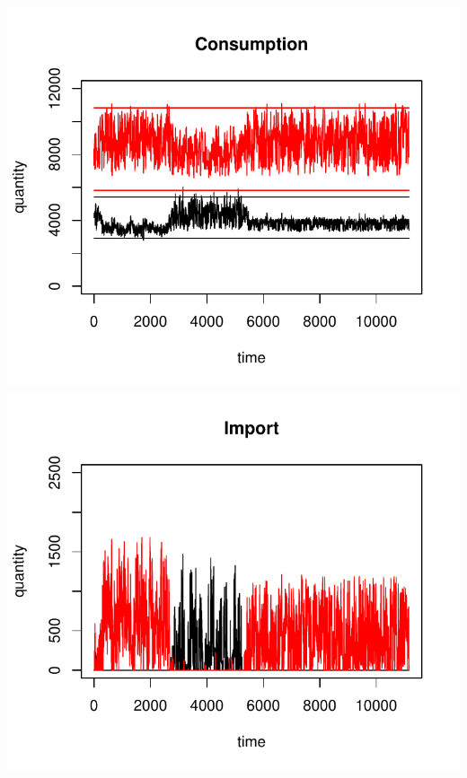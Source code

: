 \documentclass{article}
\begin{document}
\vskip2mm
\hskip-1cm
\includegraphics[scale=0.5]{fig_case07_consumption}
\includegraphics[scale=0.5]{fig_case07_import}
\end{document}
